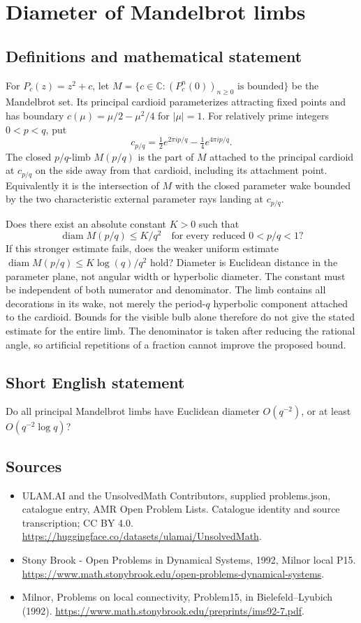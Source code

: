 \documentclass[11pt,a4paper]{article}
\begin{document}
\section*{Diameter of Mandelbrot limbs}\label{statement}

\subsection{Definitions and mathematical statement}
For $P_c(z)=z^2+c$, let
$M=\{c\in\mathbb C:(P_c^n(0))_{n\ge0}\text{ is bounded}\}$
be the Mandelbrot set. Its principal cardioid parameterizes attracting
fixed points and has boundary
$c(\mu)=\mu/2-\mu^2/4$ for $|\mu|=1$.
For relatively prime integers $0<p<q$, put
\[
 c_{p/q}=\tfrac12e^{2\pi ip/q}-\tfrac14e^{4\pi ip/q}.
\]
The closed $p/q$-limb $M(p/q)$ is the part of $M$ attached to the
principal cardioid at $c_{p/q}$ on the side away from that cardioid,
including its attachment point. Equivalently it is the intersection
of $M$ with the closed parameter wake bounded by the two characteristic
external parameter rays landing at $c_{p/q}$.

Does there exist an absolute constant $K>0$ such that
\[
 \operatorname{diam}M(p/q)\le K/q^2
 \quad\text{for every reduced }0<p/q<1?
\]
If this stronger estimate fails, does the weaker uniform estimate
$\operatorname{diam}M(p/q)\le K\log(q)/q^2$ hold?
Diameter is Euclidean distance in the parameter plane, not angular
width or hyperbolic diameter. The constant must be independent of
both numerator and denominator. The limb contains all decorations
in its wake, not merely the period-$q$ hyperbolic component attached
to the cardioid. Bounds for the visible bulb alone therefore do not
give the stated estimate for the entire limb. The denominator is taken
after reducing the rational angle, so artificial repetitions of a fraction
cannot improve the proposed bound.
\subsection{Short English statement}
Do all principal Mandelbrot limbs have Euclidean diameter $O(q^{-2})$, or at least $O(q^{-2}\log q)$?
\subsection{Sources}
\begin{itemize}
\item[S1] ULAM.AI and the UnsolvedMath Contributors, supplied problems.json, catalogue entry, AMR Open Problem Lists. Catalogue identity and source transcription; CC BY 4.0.
\url{https://huggingface.co/datasets/ulamai/UnsolvedMath}.
\item[S2] Stony Brook - Open Problems in Dynamical Systems, 1992, Milnor local P15. 
\url{https://www.math.stonybrook.edu/open-problems-dynamical-systems}.
\item[S3] Milnor, Problems on local connectivity, Problem15, in Bielefeld–Lyubich (1992).
\url{https://www.math.stonybrook.edu/preprints/ims92-7.pdf}.
\end{itemize}
\end{document}
